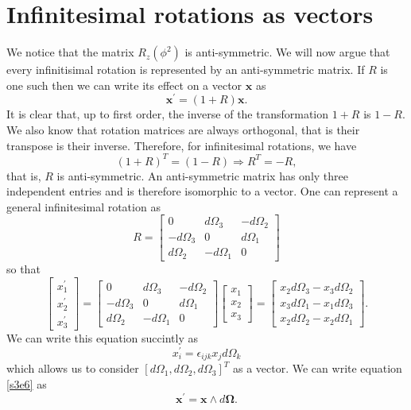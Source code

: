 \documentclass{article}
\numberwithin{equation}{section}
\let\vec\bm
\begin{document}
\section{Infinitesimal rotations as vectors}\label{s3}
We notice that the matrix $R_z(\phi^2)$ is anti-symmetric. We will now argue
that every infinitisimal rotation is represented by an anti-symmetric matrix.
If $R$ is one such then we can write its effect on a vector $\vec{x}$ as
\begin{equation}\label{s3e1}
\vec{x}^\prime = (1 + R)\vec{x}.
\end{equation}
It is clear that, up to first order, the inverse of the transformation $1 + R$
is $1 - R$. We also know that rotation matrices are always orthogonal, that is
their transpose is their inverse. Therefore, for infinitesimal rotations, we
have \cite{wolfram1}
\begin{equation}\label{s3e2}
(1 + R)^T = (1 - R) \Rightarrow R^T = -R,
\end{equation}
that is, $R$ is anti-symmetric. An anti-symmetric matrix has only three
independent entries and is therefore isomorphic to a vector. One can represent
a general infinitesimal rotation as
\begin{equation}\label{s3e3}
R = \begin{bmatrix}0 & d\Omega_3 & -d\Omega_2 \\
-d\Omega_3 & 0 & d\Omega_1 \\
d\Omega_2 & -d\Omega_1 & 0
\end{bmatrix}
\end{equation}
so that 
\begin{equation}\label{s3e4}
\begin{bmatrix}x_1^\prime \\ x_2^\prime \\ x_3^\prime \end{bmatrix} = 
\begin{bmatrix}0 & d\Omega_3 & -d\Omega_2 \\
-d\Omega_3 & 0 & d\Omega_1 \\
d\Omega_2 & -d\Omega_1 & 0
\end{bmatrix}\begin{bmatrix}x_1 \\ x_2 \\ x_3 \end{bmatrix}
= \begin{bmatrix}
x_2d\Omega_3 - x_3d\Omega_2 \\
x_3d\Omega_1 - x_1d\Omega_3 \\
x_2d\Omega_2 - x_2d\Omega_1
\end{bmatrix}.
\end{equation}
We can write this equation succintly as
\begin{equation}\label{s3e5}
x_i^\prime = \epsilon_{ijk}x_jd\Omega_k
\end{equation}
which allows us to consider $[d\Omega_1, d\Omega_2, d\Omega_3]^T$ as a vector.
We can write equation \eqref{s3e6} as
\begin{equation}\label{s3e6}
\vec{x}^\prime = \vec{x} \wedge d\vec{\Omega}.
\end{equation}
\end{document}
